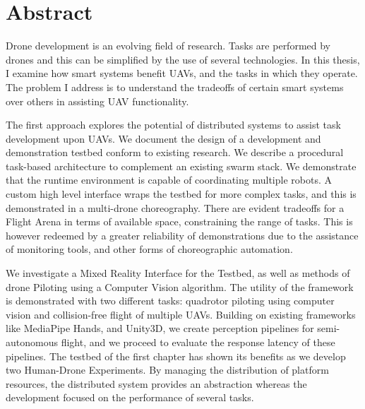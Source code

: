 
\chapter*{Abstract}



Drone development is an evolving field of research. Tasks are performed by drones and this can be simplified by the use of several technologies. In this thesis, I examine how smart systems benefit UAVs, and the tasks in which they operate. The problem I address is to understand the tradeoffs of certain smart systems over others in assisting UAV functionality.

The first approach explores the potential of distributed systems to assist task development upon UAVs. We document the design of a development and demonstration testbed conform to existing research. We describe a procedural task-based architecture to complement an existing swarm stack. We demonstrate that the runtime environment is capable of coordinating multiple robots. A custom high level interface wraps the testbed for more complex tasks, and this is demonstrated in a multi-drone choreography. There are evident tradeoffs for a Flight Arena in terms of available space, constraining the range of tasks. This is however redeemed by a greater reliability of demonstrations due to the assistance of monitoring tools, and other forms of choreographic automation.

We investigate a Mixed Reality Interface for the Testbed, as well as methods of drone Piloting using a Computer Vision algorithm. The utility of the framework is demonstrated with two different tasks: quadrotor piloting using computer vision and collision-free flight of multiple UAVs. Building on existing frameworks like MediaPipe Hands, and Unity3D, we create perception pipelines for semi-autonomous flight, and we proceed to evaluate the response latency of these pipelines. The testbed of the first chapter has shown its benefits as we develop two Human-Drone Experiments. By managing the distribution of platform resources, the distributed system provides an abstraction whereas the development focused on the performance of several tasks.

